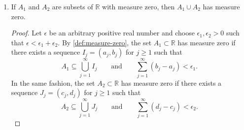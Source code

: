 \begin{enumerate}
\begin{enumerate}
                \medskip

                \begin{proposition} \label{prop:1a}
                    Every countable subset of $\mathbb{R}$ has measure zero.
                \end{proposition}

                \smallskip

                \begin{proof}
                    Let $X = \{x_n\}_{n \ge 1}$ be a countable subset of $\mathbb{R}$ and $\epsilon$ be an arbitrary positive real number.
                    Choose $\epsilon_0$ such that $0 < \epsilon_0 < \epsilon$, and construct
                    \[
                        I_j := \left(x_j - \frac{\epsilon_0}{2}, x_j + \frac{\epsilon_0}{2}\right).
                    \]

                    Note that $x_j \in I_j$ for all $j \ge 1$, hence
                    \[ X \subset \bigcup_{j = 1}^\infty I_j. \]
                    Also, for all $I_j = (a_j, b_j)$, we have
                    \[
                        b_j - a_j = \left(x_j + \frac{\epsilon_0}{2}\right) - \left(x_j - \frac{\epsilon_0}{2}\right)
                        = \epsilon_0 < \epsilon.
                    \]

                    Thus, the sequence $\{I_j\}_{j \ge 1}$ satisfies the criteria in \cref{def:measure-zero} for any $\epsilon$, hence $X$ has measure zero.
                \end{proof}

                \bigskip

            \item
                \begin{proposition} \label{prop:1b}
                    If $A_1$ and $A_2$ are subsets of $\mathbb{R}$ with measure zero, then $A_1 \cup A_2$ has measure zero.
                \end{proposition}

                \smallskip

                \begin{proof}
                    Let $\epsilon$ be an arbitrary positive real number and choose $\epsilon_1, \epsilon_2 > 0$ such that $\epsilon < \epsilon_1 + \epsilon_2$.
                    By \cref{def:measure-zero}, the set $A_1 \subset \mathbb{R}$ has measure zero if there exists a sequence $I_j = (a_j, b_j)$ for $j \ge 1$ such that
                    \[
                        A_1 \subseteq \bigcup_{j = 1}^\infty I_j \qquad
                        \text{and} \qquad
                        \sum_{j = 1}^\infty (b_j - a_j) < \epsilon_1.
                    \]
                    In the same fashion, the set $A_2 \subset \mathbb{R}$ has measure zero if there exists a sequence $J_j = (c_j, d_j)$ for $j \ge 1$ such that
                    \[
                        A_2 \subseteq \bigcup_{j = 1}^\infty J_j \qquad
                        \text{and} \qquad
                        \sum_{j = 1}^\infty (d_j - c_j) < \epsilon_2.
                    \]


\end{proof}
\end{enumerate}
\end{enumerate}
